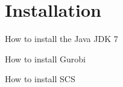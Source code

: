 \chapter{Installation}
\label{chapter:installation}

How to install the Java JDK 7

How to install Gurobi

How to install SCS
